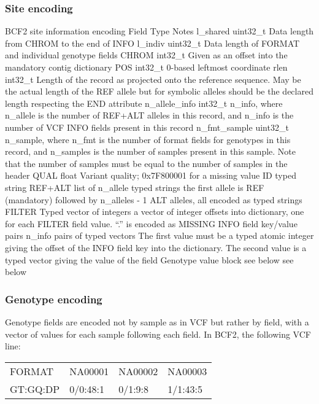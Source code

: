 \documentclass[8pt]{article}
\begin{document}
\subsubsection{Site encoding}

BCF2 site information encoding
Field	Type	Notes
l\_shared	uint32\_t	Data length from CHROM to the end of INFO
l\_indiv	uint32\_t	Data length of FORMAT and individual genotype fields
CHROM	int32\_t	Given as an offset into the mandatory contig dictionary
POS	int32\_t	0-based leftmost coordinate
rlen	int32\_t	Length of the record as projected onto the reference sequence.  May be the actual length of the REF allele but for symbolic alleles should be the declared length respecting the END attribute
n\_allele\_info	int32\_t	n\_info, where n\_allele is the number of REF+ALT alleles in this record, and n\_info is the number of VCF INFO fields present in this record
n\_fmt\_sample	uint32\_t	n\_sample, where n\_fmt is the number of format fields for genotypes in this record, and n\_samples is the number of samples present in this sample.  Note that the number of samples must be equal to the number of samples in the header
QUAL	float	Variant quality; 0x7F800001 for a missing value
ID	typed string
REF+ALT	list of n\_allele typed strings	the first allele is REF (mandatory) followed by n\_alleles - 1 ALT
alleles, all encoded as typed strings
FILTER	Typed vector of integers	a vector of integer offsets into dictionary, one for each FILTER field value.  ``.'' is encoded as MISSING
INFO field key/value pairs	n\_info pairs of typed vectors	The first value must be a typed atomic integer giving the offset of the INFO field key into the dictionary.  The second value is a typed vector giving the value of the field
Genotype value block	see below	see below


\subsubsection{Genotype encoding}

Genotype fields are encoded not by sample as in VCF but rather by field, with a vector of values for each sample following each field.  In BCF2, the following VCF line:

\vspace{0.3cm}
\begin{tabular}{l l l l}
FORMAT & NA00001 & NA00002 & NA00003 \\
GT:GQ:DP & 0/0:48:1 & 0/1:9:8 & 1/1:43:5 \\
\end{tabular}
\vspace{0.3cm}
\end{document}
